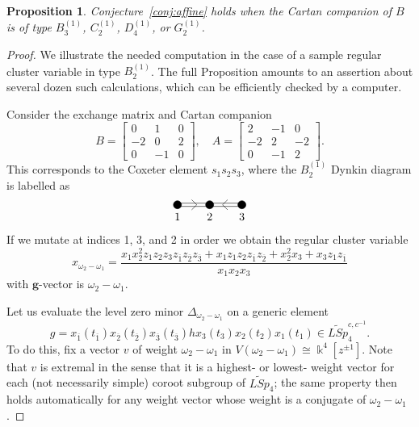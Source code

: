 \documentclass[12pt]{amsart}
\newcommand{\kk}{\Bbbk}
\newcommand{\bfg}{\mathbf{g}}
\newcommand{\ol}[1]{\overline{#1}}
\newcommand{\loopvar}{z}
\newtheorem{proposition}[theorem]{Proposition}
\theoremstyle{remark}
\numberwithin{equation}{section}
\numberwithin{figure}{section}
\begin{document}
\begin{proposition}
  Conjecture~\ref{conj:affine} holds when the Cartan companion of $B$ is of type $B_3^{(1)}$, $C_2^{(1)}$, $D_4^{(1)}$, or $G_2^{(1)}$.
\end{proposition}
\begin{proof}
  We illustrate the needed computation in the case of a sample regular cluster variable in type $B_{2}^{(1)}$.
  The full Proposition amounts to an assertion about several dozen such calculations, which can be efficiently checked by a computer.

  Consider the exchange matrix and Cartan companion
  \[
    B =
    \begin{bmatrix}
      0 & 1 & 0 \\
      -2 & 0 & 2 \\
      0 & -1 & 0
    \end{bmatrix},
    \quad
    A =
    \begin{bmatrix}
      2 & -1 & 0 \\
      -2 & 2 & -2 \\
      0 & -1 & 2
    \end{bmatrix}.
  \]
  This corresponds to the Coxeter element $s_1 s_2 s_3$, where the $B_2^{(1)}$ Dynkin diagram is labelled as
  \vspace{3mm}
  \[
    \begin{tikzpicture}[scale=0.5]
      \draw (0, 0.1 cm) -- +(2 cm,0);
      \draw (0, -0.1 cm) -- +(2 cm,0);
      \draw[shift={(1.2, 0)}, rotate=0] (135 : 0.45cm) -- (0,0) -- (-135 : 0.45cm);
      {
        \pgftransformxshift{2 cm}
        \draw (0 cm,0) -- (0 cm,0);
        \draw (0 cm, 0.1 cm) -- +(2 cm,0);
        \draw (0 cm, -0.1 cm) -- +(2 cm,0);
        \draw[shift={(0.8, 0)}, rotate=180] (135 : 0.45cm) -- (0,0) -- (-135 : 0.45cm);
        \draw[fill=black] (0 cm, 0 cm) circle (.25cm) node[below=4pt]{$2$};
        \draw[fill=black] (2 cm, 0 cm) circle (.25cm) node[below=4pt]{$3$};
      }
      \draw[fill=black] (0 cm, 0 cm) circle (.25cm) node[below=4pt]{$1$};
    \end{tikzpicture}
  \]
  If we mutate at indices 1, 3, and 2 in order we obtain the regular cluster variable
  \[
    x_{\omega_2 - \omega_1} = \frac{x_1 x_2^2 z_1 z_2 z_3 z_{\ol{1}} z_{\ol{2}} z_{\ol{3}} + x_1 z_1 z_2 z_{\ol{1}} z_{\ol{2}} + x_2^2 x_3 +  x_3 z_1 z_{\ol{1}}}{x_1 x_2 x_3}
  \]
  with $\bfg$-vector is $\omega_2 - \omega_1$.

  Let us evaluate the level zero minor $\Delta_{\omega_2 - \omega_1}$ on a generic element
  \[
    g = x_{\ol{1}}(t_{\ol{1}})x_{\ol{2}}(t_{\ol{2}})x_{\ol{3}}(t_{\ol{3}})hx_3(t_3)x_2(t_2)x_1(t_1) \in \widetilde{LSp}_4^{c,c^{-1}}.
  \]
  To do this, fix a vector $v$ of weight $\omega_2 - \omega_1$  in $V(\omega_2 - \omega_1) \cong \kk^4[\loopvar^{\pm 1}]$.
  Note that $v$ is extremal in the sense that it is a highest- or lowest- weight vector for each (not necessarily simple) coroot subgroup of $\widetilde{LSp}_4$; the same property then holds automatically for any weight vector whose weight is a conjugate of $\omega_2 - \omega_1$.


\end{proof}
\end{document}
